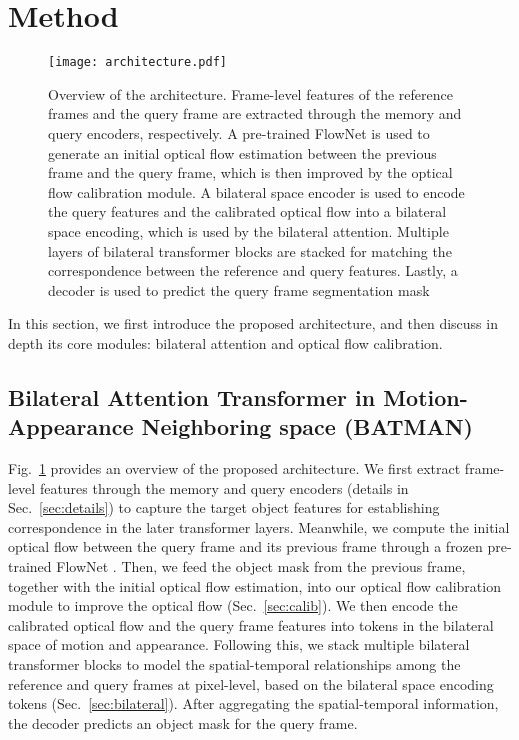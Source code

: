 \documentclass[runningheads]{llncs}
\begin{document}
\section{Method}
\begin{figure}[t]
\centering
\texttt{[image: architecture.pdf]}
\caption{Overview of the {\shortname} architecture. Frame-level features of the reference frames and the query frame are extracted through the memory and query encoders, respectively. A pre-trained FlowNet is used to generate an initial optical flow estimation between the previous frame and the query frame, which is then improved by the optical flow calibration module. A bilateral space encoder is used to encode the query features and the calibrated optical flow into a bilateral space encoding, which is used by the bilateral attention. Multiple layers of bilateral transformer blocks are stacked for matching the correspondence between the reference and query features. Lastly, a decoder is used to predict the query frame segmentation mask}
\label{fig:architecture}
\end{figure}
In this section, we first introduce the proposed {\shortname} architecture, and then discuss in depth its core modules: bilateral attention and optical flow calibration.

\subsection{Bilateral Attention Transformer in Motion-Appearance Neighboring space (BATMAN)}
Fig.~\ref{fig:architecture} provides an overview of the proposed {\shortname} architecture. We first extract frame-level features through the memory and query encoders (details in Sec.~\ref{sec:details}) to capture the target object features for establishing correspondence in the later transformer layers. Meanwhile, we compute the initial optical flow between the query frame and its previous frame through a frozen pre-trained FlowNet \cite{teed2020raft}. Then, we feed the object mask from the previous frame, together with the initial optical flow estimation, into our optical flow calibration module to improve the optical flow (Sec.~\ref{sec:calib}). We then encode the calibrated optical flow and the query frame features into tokens in the bilateral space of motion and appearance. Following this, we stack multiple bilateral transformer blocks to model the spatial-temporal relationships among the reference and query frames at pixel-level, based on the bilateral space encoding tokens (Sec.~\ref{sec:bilateral}). After aggregating the spatial-temporal information, the decoder predicts an object mask for the query frame. 
\end{document}
